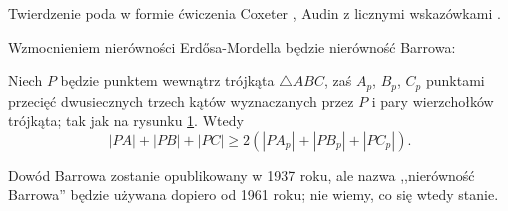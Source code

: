 \begin{figure}[H]
\begin{minipage}[b]{.45\linewidth}
\begin{center}
\begin{comment}
    \tkzDrawSegments[line width=0.2mm](P,A P,B P,C)
    \tkzDrawSegments[line width=0.2mm,dashed](P,Pa P,Pb P,Pc)
    \tkzDrawPolygon[line width=0.3mm](A,B,C)
    \tkzDrawPoints[size=3,color=black,fill=black!50](A,B,C,P,Pc,Pb,Pa)
\end{tikzpicture}
\end{comment}
    \end{center}
    \label{erdos_mordell_barrowb}
\end{minipage}
\caption{}
\end{figure}

Twierdzenie poda w formie ćwiczenia Coxeter \cite[s. 9]{coxeter_1991}, Audin z licznymi wskazówkami \cite[s. 102]{audin_2003}.

Wzmocnieniem nierówności Erdősa-Mordella będzie nierówność Barrowa:


\begin{theorem}
    Niech $P$ będzie punktem wewnątrz trójkąta $\triangle ABC$, zaś $A_p$, $B_p$, $C_p$ punktami przecięć dwusiecznych trzech kątów wyznaczanych przez $P$ i pary wierzchołków trójkąta; tak jak na rysunku \ref{erdos_mordell_barrowb}.
    Wtedy
    \begin{equation}
        |PA| + |PB| + |PC| \ge 2 (|PA_p| + |PB_p| + |PC_p|).
    \end{equation}
\end{theorem}

Dowód Barrowa zostanie opublikowany w 1937 roku, ale nazwa ,,nierówność Barrowa'' będzie używana dopiero od 1961 roku; nie wiemy, co się wtedy stanie.

%
